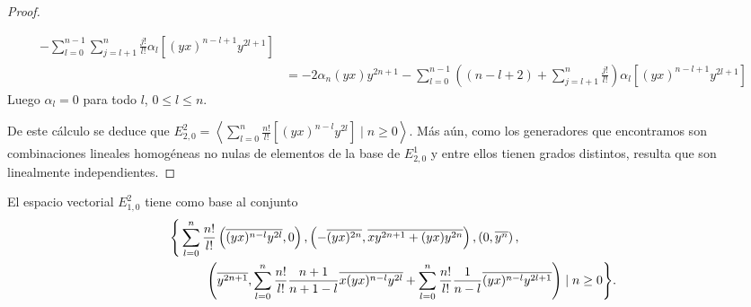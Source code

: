 \documentclass[fleqn,../tesis.tex]{subfiles}
\begin{document}
\begin{proof}
\begin{itemize}
\begin{align*}
                -\sum_{l = 0}^{n - 1}\sum_{j = l + 1}^{n}\frac{j!}{l!}\alpha_l\left[(yx)^{n - l + 1}y^{2l + 1}\right]\\
            &= -2\alpha_n (yx)y^{2n + 1}
                - \sum_{l = 0}^{n - 1}\left((n - l + 2) + \sum_{j = l + 1}^{n}\frac{j!}{l!}\right)\alpha_l\left[(yx)^{n - l + 1}y^{2l + 1}\right]
        \end{align*}
        Luego $\alpha_l = 0$ para todo $l$, $0 \leq l \leq n$.
    \end{itemize}
    De este cálculo se deduce que
        $E^{2}_{2, 0} = \left\langle \sum_{l = 0}^n \frac{n!}{l!}\left[(yx)^{n - l}y^{2l}\right] \mid n \geq 0 \right\rangle$.
    Más aún, como los generadores que encontramos son combinaciones lineales homogéneas no nulas de elementos de la base de $E^{1}_{2, 0}$
    y entre ellos tienen grados distintos, resulta que son linealmente independientes.
\end{proof}
\begin{prop}
    El espacio vectorial $E_{1, 0}^{2}$ tiene como base al conjunto
    \begin{align*}
    \Bigg\lbrace &\sum_{l = 0}^n \frac{n!}{l!}\left(\overline{(yx)^{n - l}y^{2l}}, 0\right), 
        \left(-\overline{(yx)^{2n}}, \overline{xy^{2n + 1} + (yx)y^{2n}}\right), \left(0, \overline{y^{n}}\right),\\
        &\qquad \left(\overline{y^{2n + 1}}, \sum_{l = 0}^n \frac{n!}{l!}\frac{n + 1}{n + 1 - l}\overline{x(yx)^{n - l}y^{2l}} 
            + \sum_{l = 0}^n \frac{n!}{l!}\frac{1}{n - l}\overline{(yx)^{n - l}y^{2l + 1}} \right) \mid n \geq 0 \Bigg\rbrace.
    \end{align*}
\end{prop}
\end{document}
